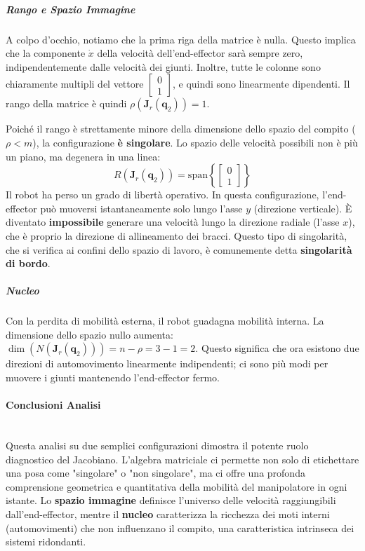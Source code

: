 ﻿\documentclass[11pt, a4paper]{article}
\begin{document}
\subparagraph{Rango e Spazio Immagine}
A colpo d'occhio, notiamo che la prima riga della matrice è nulla. Questo implica che la componente $\dot{x}$ della velocità dell'end-effector sarà sempre zero, indipendentemente dalle velocità dei giunti. Inoltre, tutte le colonne sono chiaramente multipli del vettore $\begin{bmatrix}0 \\ 1\end{bmatrix}$, e quindi sono linearmente dipendenti. Il rango della matrice è quindi $\rho(\bm{J}_r(\bm{q}_2)) = 1$.

Poiché il rango è strettamente minore della dimensione dello spazio del compito ($\rho < m$), la configurazione \textbf{è singolare}. Lo spazio delle velocità possibili non è più un piano, ma degenera in una linea:
\[
    R(\bm{J}_r(\bm{q}_2)) = \mathrm{span}\left\{ \begin{bmatrix} 0 \\ 1 \end{bmatrix} \right\}
\]
Il robot ha perso un grado di libertà operativo. In questa configurazione, l'end-effector può muoversi istantaneamente solo lungo l'asse $y$ (direzione verticale). È diventato \textbf{impossibile} generare una velocità lungo la direzione radiale (l'asse $x$), che è proprio la direzione di allineamento dei bracci. Questo tipo di singolarità, che si verifica ai confini dello spazio di lavoro, è comunemente detta \textbf{singolarità di bordo}.

\subparagraph{Nucleo}
Con la perdita di mobilità esterna, il robot guadagna mobilità interna. La dimensione dello spazio nullo aumenta: $\dim(N(\bm{J}_r(\bm{q}_2))) = n - \rho = 3 - 1 = 2$. Questo significa che ora esistono due direzioni di automovimento linearmente indipendenti; ci sono più modi per muovere i giunti mantenendo l'end-effector fermo.

\paragraph{Conclusioni Analisi}
\mbox{}\\ %
Questa analisi su due semplici configurazioni dimostra il potente ruolo diagnostico del Jacobiano. L'algebra matriciale ci permette non solo di etichettare una posa come "singolare" o "non singolare", ma ci offre una profonda comprensione geometrica e quantitativa della mobilità del manipolatore in ogni istante. Lo \textbf{spazio immagine} definisce l'universo delle velocità raggiungibili dall'end-effector, mentre il \textbf{nucleo} caratterizza la ricchezza dei moti interni (automovimenti) che non influenzano il compito, una caratteristica intrinseca dei sistemi ridondanti.
\end{document}
